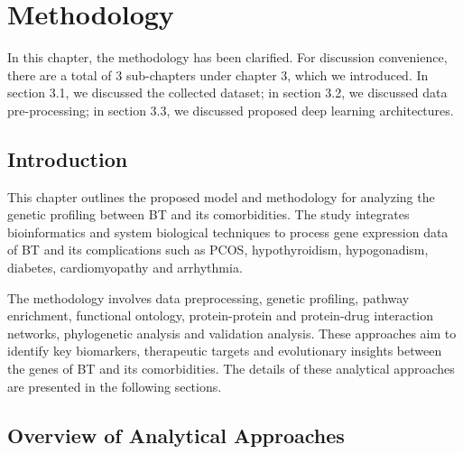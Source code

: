 %
%
\let\textcircled=\pgftextcircled
\chapter{Methodology}
\label{chap:methodology}
In this chapter, the methodology has been clarified. For discussion convenience, there are a total of 3 sub-chapters under chapter 3, which we introduced. In section 3.1, we discussed the collected dataset; in section 3.2, we discussed data pre-processing; in section 3.3, we discussed proposed deep learning architectures.

\vspace{150mm}

\section{Introduction}
\label{sec:sec3_1}
This chapter outlines the proposed model and methodology for analyzing the genetic profiling between BT and its comorbidities. The study integrates bioinformatics and system biological techniques to process gene expression data of BT and its complications such as PCOS, hypothyroidism, hypogonadism, diabetes, cardiomyopathy and arrhythmia.

The methodology involves data preprocessing, genetic profiling, pathway enrichment, functional ontology, protein-protein and protein-drug interaction networks, phylogenetic analysis and validation analysis. These approaches aim to identify key biomarkers, therapeutic targets and evolutionary insights between the genes of BT and its comorbidities. The details of these analytical approaches are presented in the following sections.

\section{Overview of Analytical Approaches}
\label{sec:sec3_2}

